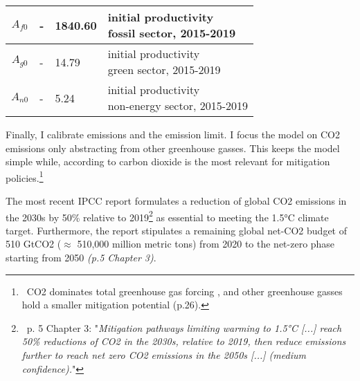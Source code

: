 \begin{table}[h!]
\begin{center}
\begin{tabular}{c|lll}
 			\hline
 			$A_{f0}$&- &1840.60& \makecell[l]{initial productivity \\ fossil sector, 2015-2019}  \\
 			\hline
 			$A_{g0}$&- &14.79& \makecell[l]{initial productivity \\ green sector, 2015-2019}  \\
 			\hline
 			$A_{n0}$&- &5.24& \makecell[l]{initial productivity \\ non-energy sector, 2015-2019}  \\
 			\hline \hline
 		\end{tabular}
 	\end{center}
 \end{table}
 \clearpage
 
 
 Finally, I calibrate emissions and the emission limit.  I focus the model on CO2 emissions only abstracting from other greenhouse gasses. This keeps the model simple while, according to \cite{IPCC2022} carbon dioxide is the most relevant for mitigation policies.\footnote{\ CO2 dominates total greenhouse gas forcing \citep[p.29]{IPCC2022}, and other greenhouse gasses hold a smaller mitigation potential (p.26).}
 
 The most recent IPCC report \citep{IPCC2022} formulates a reduction of global CO2 emissions in the 2030s by 50\% relative to 2019\footnote{\ p. 5 Chapter 3: "\textit{Mitigation pathways limiting warming to 1.5°C [...] reach 50\% reductions of CO2 in the 2030s, relative to 2019, then reduce emissions further to reach net zero CO2 emissions in the 2050s [...] (\textnormal{medium confidence}).}"}  as essential to meeting the 1.5°C climate target.  Furthermore, the report stipulates a remaining global net-CO2 budget of 510 GtCO2 ($\approx$ 510,000 million metric tons) from 2020 to the net-zero phase starting from 2050 \textit{(p.5 Chapter 3)}. 
 
